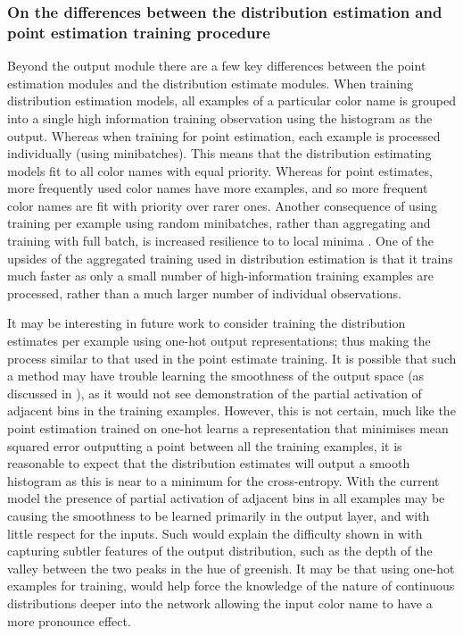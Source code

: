 \documentclass[11pt,a4paper]{article}
\begin{document}
\subsubsection{On the differences between the distribution estimation and point estimation training procedure}

Beyond the output module there are a few key differences between the point estimation modules and the distribution estimate modules.
When training distribution estimation models, all examples of a particular color name is grouped into a single high information training observation using the histogram as the output.
Whereas when training for point estimation, each example is processed individually (using minibatches).
This means that the distribution estimating models fit to all color names with equal priority.
Whereas for point estimates, more frequently used color names have more examples, and so more frequent color names are fit with priority over rarer ones.
Another consequence of using training per example using random minibatches, rather than aggregating and training with full batch, is increased resilience to to local minima \parencite{lecun2012efficient}.
One of the upsides of the aggregated training used in distribution estimation is that it trains much faster as only a small number of high-information training examples are processed, rather than a much larger number of individual observations.


It may be interesting in future work to consider training the distribution estimates per example using one-hot output representations; thus making the process similar to that used in the point estimate training.
It is  possible that such a method may have trouble learning the smoothness of the output space (as discussed in ),
as it would not see demonstration of the partial activation of adjacent bins in the training examples.
However, this is not certain,  much like the point estimation trained on one-hot learns a representation that minimises mean squared error outputting  a point  between  all the training examples, it is reasonable to  expect that the distribution estimates will output a smooth histogram  as  this is near to a minimum for the cross-entropy.
With the current model the presence of partial activation of adjacent bins in all examples  may be causing the smoothness to  be learned primarily in the output layer, and with little respect for the inputs.
Such would explain the difficulty shown in  with capturing subtler features of the output distribution, such as the depth of the valley between the two peaks in the hue of greenish.
It may be that using one-hot examples for training, would help force the knowledge of the nature of continuous distributions deeper into the network allowing the input color name to have a more pronounce effect.
\end{document}
